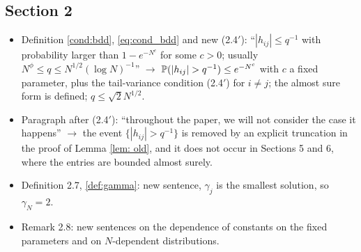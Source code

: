 \subsection*{Section 2}
\begin{itemize}
\item Definition \ref{cond:bdd}, \eqref{eq:cond_bdd} and new (2.4$'$): ``$|h_{ij}|\le q^{-1}$ with probability larger than $1-e^{-N^c}$ for some $c>0$; usually $N^\phi\le q\le N^{1/2}(\log N)^{-1}$'' $\to$ $\p(|h_{ij}|>q^{-1})\le e^{-N^c}$ with $c$ a fixed parameter, plus the tail-variance condition (2.4$'$) for $i\ne j$; the almost sure form is defined; $q\le\sqrt2N^{1/2}$.
\item Paragraph after (2.4$'$): ``throughout the paper, we will not consider the case it happens'' $\to$ the event $\{|h_{ij}|>q^{-1}\}$ is removed by an explicit truncation in the proof of Lemma \ref{lem: old}, and it does not occur in Sections 5 and 6, where the entries are bounded almost surely.
\item Definition 2.7, \eqref{def:gamma}: new sentence, $\gamma_j$ is the smallest solution, so $\gamma_N=2$.
\item Remark 2.8: new sentences on the dependence of constants on the fixed parameters and on $N$-dependent distributions.
\end{itemize}

